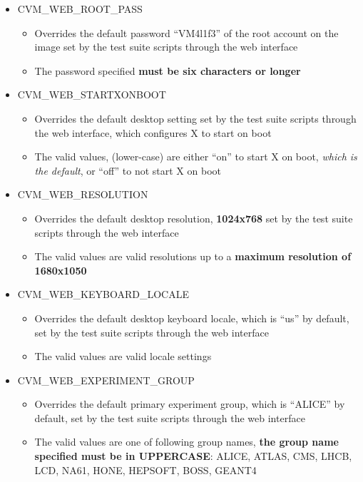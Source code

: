 \begin{itemize}
\item	CVM\_WEB\_ROOT\_PASS
		\begin{itemize}
		\item	Overrides the default password ``VM4l1f3'' of the root account
				on the \cernvm image set by the test suite scripts through the
				web interface
		\item	The password specified {\bf must be six characters or longer}
		\end{itemize}
		
\item	CVM\_WEB\_STARTXONBOOT
		\begin{itemize}
		\item	Overrides the default \cernvm desktop setting set by the test 
				suite scripts through the web interface, which configures X to
				start on boot
		\item	The valid values, (lower-case) are either ``on'' to start X on boot,
				\emph{which is the default}, or ``off'' to not start X on boot		
		\end{itemize}
				
\item	CVM\_WEB\_RESOLUTION
		\begin{itemize}
		\item	Overrides the default \cernvm desktop resolution, {\bf 1024x768} set by
				the test suite scripts through the web interface
		\item	The valid values are valid resolutions up to a {\bf maximum resolution
				of 1680x1050}
		\end{itemize}

\item	CVM\_WEB\_KEYBOARD\_LOCALE
		\begin{itemize}
		\item	Overrides the default \cernvm desktop keyboard locale, which is ``us'' by
				default, set by the test suite scripts through the web interface
		\item	The valid values are valid locale settings
		\end{itemize}

\item	CVM\_WEB\_EXPERIMENT\_GROUP
		\begin{itemize}
		\item	Overrides the default \cernvm primary experiment group, which is ``ALICE''
				by default, set by the test suite scripts through the web interface
		\item	The valid values are one of following group names, {\bf the group name
				specified must be in UPPERCASE}: ALICE, ATLAS, CMS, LHCB, LCD, NA61, HONE,
				HEPSOFT, BOSS, GEANT4	
		\end{itemize}
\end{itemize}


